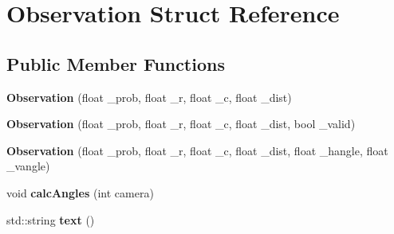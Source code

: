 \hypertarget{structObservation}{}\section{Observation Struct Reference}
\label{structObservation}
\subsection*{Public Member Functions}
\begin{DoxyCompactItemize}
\item 
\mbox{\label{structObservation_a084f045f20dbeb93bcaa8e4d9ba3b4bd}} 
{\bfseries Observation} (float \+\_\+prob, float \+\_\+r, float \+\_\+c, float \+\_\+dist)
\item 
\mbox{\label{structObservation_aae21efa16efe204a2f651dd2293875f0}} 
{\bfseries Observation} (float \+\_\+prob, float \+\_\+r, float \+\_\+c, float \+\_\+dist, bool \+\_\+valid)
\item 
\mbox{\label{structObservation_abebc01f7ac32692a24ff914eaeded264}} 
{\bfseries Observation} (float \+\_\+prob, float \+\_\+r, float \+\_\+c, float \+\_\+dist, float \+\_\+hangle, float \+\_\+vangle)
\item 
\mbox{\label{structObservation_ac382c3a0586cd7115161c8879483ceef}} 
void {\bfseries calc\+Angles} (int camera)
\item 
\mbox{\label{structObservation_ac338bdd1db14be47ac8e75d47044f2dd}} 
std\+::string {\bfseries text} ()
\end{DoxyCompactItemize}
